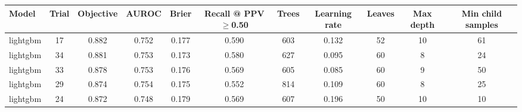 \begin{tabular}{@{}lcccccccccc@{}}
\toprule
Model & Trial & Objective & AUROC & Brier & Recall @ PPV$\geq$0.50 & Trees & Learning rate & Leaves & Max depth & Min child samples\\
\midrule
lightgbm & 17 & 0.882 & 0.752 & 0.177 & 0.590 & 603 & 0.132 & 52 & 10 & 61\\
lightgbm & 34 & 0.881 & 0.753 & 0.173 & 0.580 & 627 & 0.095 & 60 & 8 & 24\\
lightgbm & 33 & 0.878 & 0.753 & 0.176 & 0.569 & 605 & 0.085 & 60 & 9 & 50\\
lightgbm & 29 & 0.874 & 0.754 & 0.175 & 0.552 & 814 & 0.109 & 60 & 8 & 25\\
lightgbm & 24 & 0.872 & 0.748 & 0.179 & 0.569 & 607 & 0.196 & 50 & 10 & 10\\
\bottomrule
\end{tabular}
